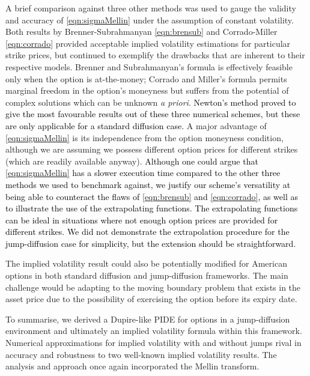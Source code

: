 A brief comparison against three other methods was used to gauge the validity and accuracy of \eqref{eqn:sigmaMellin} under the assumption of constant volatility. Both results by Brenner-Subrahmanyan \eqref{eqn:brensub} and Corrado-Miller \eqref{eqn:corrado} provided acceptable implied volatility estimations for particular strike prices, but continued to exemplify the drawbacks that are inherent to their respective models. Brenner and Subrahmanyan's formula is effectively feasible only when the option is at-the-money; Corrado and Miller's formula permits marginal freedom in the option's moneyness but suffers from the potential of complex solutions which can be unknown \emph{a priori}. \textcolor{black}{Newton's method proved to give the most favourable results out of these three numerical schemes, but these are only applicable for a standard diffusion case.} A major advantage of \eqref{eqn:sigmaMellin} is its independence from the option moneyness condition, although we are assuming we possess different option prices for different strikes (which are readily available anyway). \textcolor{black}{Although one could argue that \eqref{eqn:sigmaMellin} has a slower execution time compared to the other three methods we used to benchmark against, we justify our scheme's versatility at being able to counteract the flaws of \eqref{eqn:brensub} and \eqref{eqn:corrado}, as well as to illustrate the use of the extrapolating functions. The extrapolating functions can be ideal in situations where not enough option prices are provided for different strikes. We did not demonstrate the extrapolation procedure for the jump-diffusion case for simplicity, but the extension should be straightforward.}

The implied volatility result could also be potentially modified for American options in both standard diffusion and jump-diffusion frameworks. The main challenge would be adapting to the moving boundary problem that exists in the asset price due to the possibility of exercising the option before its expiry date. %

To summarise, we derived a Dupire-like PIDE for options in a jump-diffusion environment and ultimately an implied volatility formula within this framework. Numerical approximations for implied volatility with and without jumps rival in accuracy and robustness to two well-known implied volatility results. The analysis and approach once again incorporated the Mellin transform.
